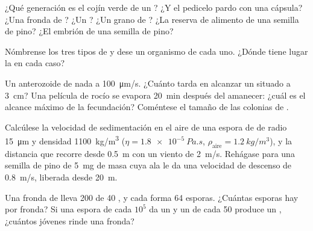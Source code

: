 \begin{exercise}[$\star$]\label{exo:b2:plant-life-cycles:3}
¿Qué generación es el cojín verde de un ? ¿Y el pedicelo pardo con
una cápsula? ¿Una fronda de ? ¿Un ? ¿Un grano de ? ¿La
reserva de alimento de una semilla de pino? ¿El embrión de una semilla
de pino?
\end{exercise}

\begin{exercise}[$\star$]\label{exo:b2:plant-life-cycles:4}
Nómbrense los tres tipos de  y dese un organismo de cada
uno. ¿Dónde tiene lugar la  en cada caso?
\end{exercise}

\begin{exercise}[$\star\star$]\label{exo:b2:plant-life-cycles:5}
Un anterozoide de  nada a \qty{100}{\micro m/s}. ¿Cuánto tarda en
alcanzar un  situado a \qty{3}{cm}? Una película de rocío se
evapora \qty{20}{min} después del amanecer: ¿cuál es el alcance máximo de
la fecundación? Coméntese el tamaño de las colonias de .
\end{exercise}

\begin{exercise}[$\star\star$]\label{exo:b2:plant-life-cycles:6}
Calcúlese la velocidad de sedimentación en el aire de una espora de
 de radio \qty{15}{\micro m} y densidad \qty{1100}{kg/m^3} ($\eta =
\qty{1.8e-5}{Pa.s}$, $\rho_{\text{aire}} = \qty{1.2}{kg/m^3}$), y la
distancia que recorre desde \qty{0.5}{m} con un viento de \qty{2}{m/s}.
Rehágase para una semilla de pino de \qty{5}{mg} de masa cuya ala le da
una velocidad de descenso de \qty{0.8}{m/s}, liberada desde \qty{20}{m}.
\end{exercise}

\begin{exercise}[$\star\star$]\label{exo:b2:plant-life-cycles:7}
Una fronda de  lleva \num{200}  de \num{40} , y
cada  forma \num{64} esporas. ¿Cuántas esporas hay por fronda?
Si una espora de cada $10^{5}$ da un  y un  de cada
\num{50} produce un , ¿cuántos  jóvenes rinde una
fronda?
\end{exercise}

